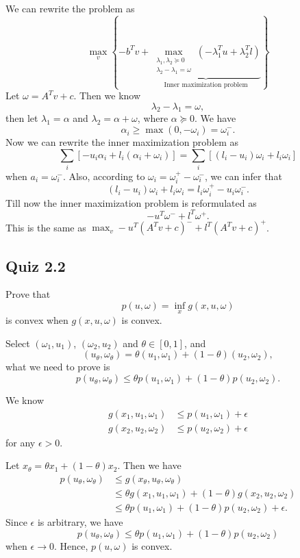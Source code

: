 \documentclass[lang=en,color=blue,mode=fancy,titlestyle=hang]{elegantbook}
\begin{document}
We can rewrite the problem as
\[
\max_{v} \left\{ 
    -b^T v +
    \underbrace{
        \max_{\substack{\lambda_1, \lambda_2 \succeq 0 \\ \lambda_2 - \lambda_1 = \omega}} \left( -\lambda_1^T u + \lambda_2^T l \right)
    }_{\text{Inner maximization problem}}
\right\}
\]
Let $\omega = A^T v + c$. Then we know
\[
\lambda_2 - \lambda_1 = \omega,
\]
then let $\lambda_1 = \alpha$ and $\lambda_2 = \alpha + \omega$, where $\alpha \succeq 0$. We have
\[
\alpha_i \geq \max(0, -\omega_i) = \omega_i^-.
\]
Now we can rewrite the inner maximization problem as
\[
\sum_i [-u_i \alpha_i + l_i (\alpha_i + \omega_i)] = \sum_i [(l_i - u_i) \omega_i + l_i \omega_i]
\]
when $a_i = \omega_i^-$. Also, according to $\omega_i = \omega_i^+ - \omega_i^-$, we can infer that
\[
(l_i - u_i) \omega_i + l_i \omega_i = l_i \omega_i^+ - u_i \omega_i^-.
\]
Till now the inner maximization problem is reformulated as
\[
-u^T \omega^- + l^T \omega^+.
\]
This is the same as $\max_v -u^T (A^T v + c)^- + l^T (A^T v + c)^+$.

\subsection{Quiz 2.2}
Prove that
\[
p(u, \omega)  = \inf_x g(x, u, \omega)
\]
is convex when $g(x, u, \omega)$ is convex.

Select $(\omega_1, u_1)$, $(\omega_2, u_2)$ and $\theta \in [0, 1]$, and
\[
(u_{\theta}, \omega_{\theta}) = \theta (u_1, \omega_1) + (1 - \theta) (u_2, \omega_2),
\]
what we need to prove is
\[
p(u_{\theta}, \omega_{\theta}) \leq \theta p(u_1, \omega_1) + (1 - \theta) p(u_2, \omega_2).
\]

We know
\begin{align*}
g(x_1, u_1, \omega_1) &\leq p(u_1, \omega_1) + \epsilon\\
g(x_2, u_2, \omega_2) &\leq p(u_2, \omega_2) + \epsilon
\end{align*}
for any $\epsilon > 0$.

Let $x_{\theta} = \theta x_1 + (1 - \theta) x_2$. Then we have
\begin{align*}
p(u_{\theta}, \omega_{\theta}) &\leq g(x_{\theta}, u_{\theta}, \omega_{\theta})\\
&\leq \theta g(x_1, u_1, \omega_1) + (1 - \theta) g(x_2, u_2, \omega_2)\\
&\leq \theta p(u_1, \omega_1) + (1 - \theta) p(u_2, \omega_2) + \epsilon.
\end{align*}
Since $\epsilon$ is arbitrary, we have
\[
p(u_{\theta}, \omega_{\theta}) \leq \theta p(u_1, \omega_1) + (1 - \theta) p(u_2, \omega_2)
\]
when $\epsilon \to 0$. Hence, $p(u, \omega)$ is convex.
\end{document}
